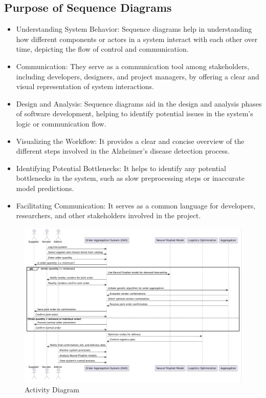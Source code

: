\subsection{Purpose of Sequence Diagrams}
\begin{itemize}
    \item {Understanding System Behavior:} Sequence diagrams help in understanding how different components or actors in a system interact with each other over time, depicting the flow of control and communication.
    \item {Communication:} They serve as a communication tool among stakeholders, including developers, designers, and project managers, by offering a clear and visual representation of system interactions.
    \item {Design and Analysis:} Sequence diagrams aid in the design and analysis phases of software development, helping to identify potential issues in the system’s logic or communication flow.
    \item {Visualizing the Workflow:} It provides a clear and concise overview of the different steps involved in the Alzheimer’s disease detection process.
    \item {Identifying Potential Bottlenecks:} It helps to identify any potential bottlenecks in the system, such as slow preprocessing steps or inaccurate model predictions.
    \item {Facilitating Communication:} It serves as a common language for developers, researchers, and other stakeholders involved in the project.
\end{itemize}

\begin{figure}[H]
    \centering
    \includegraphics[width=1\textwidth]{Figures/Sequence Diagram.PNG}
    \caption{Activity Diagram}
    \label{fig:sequence-diagram}
\end{figure}
